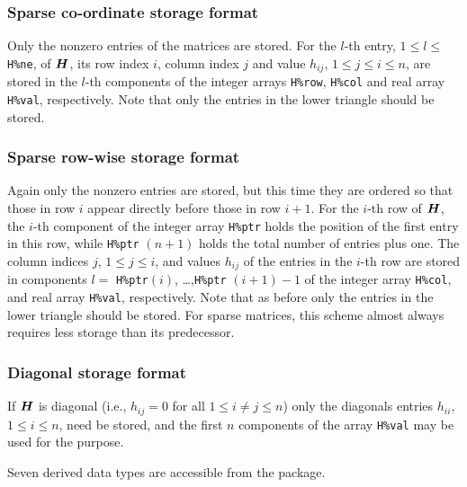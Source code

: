 \documentclass{galahad}
\begin{document}
\subsubsection{Sparse co-ordinate storage format}\label{coordinate}
Only the nonzero entries of the matrices are stored.
For the $l$-th entry, $1 \leq l \leq$ {\tt H\%ne}, of ${\bm{H}}$, 
its row index $i$, column index $j$ and value $h_{ij}$,
$1 \leq j \leq i \leq n$,
are stored in the $l$-th components of the integer arrays {\tt H\%row},
{\tt H\%col} and real array {\tt H\%val}, respectively.
Note that only the entries in the lower triangle should be stored.

\subsubsection{Sparse row-wise storage format}\label{rowwise}
Again only the nonzero entries are stored, but this time
they are ordered so that those in row $i$ appear directly before those
in row $i+1$. For the $i$-th row of ${\bm{H}}$, the $i$-th component of the
integer array {\tt H\%ptr} holds the position of the first entry in this row,
while {\tt H\%ptr} $(n+1)$ holds the total number of entries plus one.
The column indices $j$, $1 \leq j \leq i$, and values $h_{ij}$ of the
entries in the $i$-th row are stored in components
$l =$ {\tt H\%ptr}$(i)$, \ldots ,{\tt H\%ptr} $(i+1)-1$ of the
integer array {\tt H\%col}, and real array {\tt H\%val}, respectively.
Note that as before only the entries in the lower triangle should be stored.
For sparse matrices, this scheme almost always requires less storage than
its predecessor.

\subsubsection{Diagonal storage format}\label{diagonal}
If ${\bm{H}}$ is diagonal (i.e., $h_{ij} = 0$ for all $1 \leq i \neq j \leq n$)
only the diagonals entries $h_{ii}$, $1 \leq i \leq n$,  need be stored,
and the first $n$ components of the array {\tt H\%val} may be used for
the purpose.





\galtypes
Seven derived data types are accessible from the package.

\end{document}
